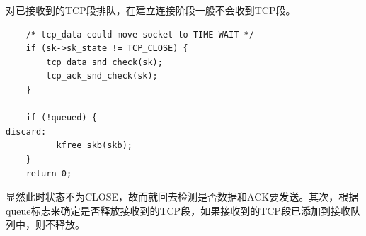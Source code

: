                对已接收到的TCP段排队，在建立连接阶段一般不会收到TCP段。

\begin{verbatim}
    /* tcp_data could move socket to TIME-WAIT */
    if (sk->sk_state != TCP_CLOSE) {
        tcp_data_snd_check(sk);
        tcp_ack_snd_check(sk);
    }

    if (!queued) {
discard:
        __kfree_skb(skb);
    }
    return 0;
\end{verbatim}

                显然此时状态不为CLOSE，故而就回去检测是否数据和ACK要发送。其次，根据queue标志来确定是否释放接收到的TCP段，如果接收到的TCP段已添加到接收队列中，则不释放。
